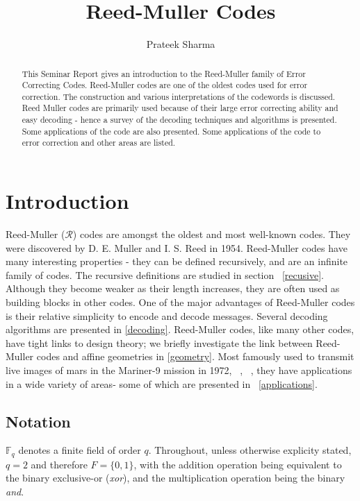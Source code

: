 \documentclass{article}
\title{Reed-Muller Codes}
\author{Prateek Sharma}
\newcommand{\F}{\ensuremath{\mathbb{F}}}
\theoremstyle{plain}
\begin{document}
\maketitle

\begin{abstract} 
This Seminar Report gives an introduction to the Reed-Muller family of Error Correcting Codes. Reed-Muller codes are one of the oldest codes used for error correction. The construction and various interpretations of the codewords is discussed. Reed Muller codes are primarily used because of their large error correcting ability and easy decoding - hence a survey of the decoding techniques and algorithms is presented. Some applications of the code are also presented. Some applications of the code to error correction and other areas are listed.
\end{abstract}


\section {Introduction}


Reed-Muller ($\mathcal{R}$) codes are amongst the oldest and most well-known codes. They were discovered by D. E. Muller and I. S. Reed in 1954. \cite{reed} \cite{muller}
Reed-Muller codes have many interesting properties - they can be defined recursively, and are an infinite family of codes. The recursive definitions are studied in section ~\ref{recusive}.
Although they become weaker as their length increases, they are often used as building blocks in other codes. One of the major advantages of Reed-Muller codes is their relative simplicity to encode and decode messages. Several decoding algorithms are presented in \ref{decoding}.  Reed-Muller codes, like many other codes, have tight links to design theory; we briefly investigate the link between Reed-Muller codes and affine geometries in \ref{geometry}.
Most famously used to transmit live images of mars in the Mariner-9 mission in 1972, ~\cite{space},~\cite{sloane} , they have applications in a wide variety of areas- some of which are presented in ~\ref{applications}.


\subsection {Notation}
\label{notation}


$\F _q$ denotes a finite field of order $q$.
Throughout, unless otherwise explicity stated, $q=2$ and therefore $F=\{0,1\}$, with the addition operation being equivalent to the binary exclusive-or (\emph{xor}), and the multiplication operation being the binary \emph{and}.
\end{document}

